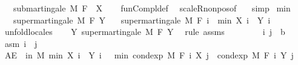 \begin{isabellebody}
\ \ \ {\isachardoublequoteopen}submartingale\ M\ F\ {\isacharparenleft}{\kern0pt}{\isacharminus}{\kern0pt}\ X{\isacharparenright}{\kern0pt}{\isachardoublequoteclose}\isanewline
%
\isadelimproof
\ \ %
\endisadelimproof
%
\isatagproof
{}\isamarkupfalse%
\ fun{\isacharunderscore}{\kern0pt}Compl{\isacharunderscore}{\kern0pt}def\ \isamarkupfalse%
\ scaleR{\isacharunderscore}{\kern0pt}nonpos{\isacharbrackleft}{\kern0pt}of\ {\isachardoublequoteopen}{\isacharminus}{\kern0pt}{}{\isachardoublequoteclose}{\isacharbrackright}{\kern0pt}\ \isamarkupfalse%
\ simp%
\endisatagproof
{\isafoldproof}%
%
\isadelimproof
\isanewline
%
\endisadelimproof
\isanewline
{}\isamarkupfalse%
\ min{\isacharcolon}{\kern0pt}\isanewline
\ \ \ {\isachardoublequoteopen}supermartingale\ M\ F\ Y{\isachardoublequoteclose}\isanewline
\ \ \ {\isachardoublequoteopen}supermartingale\ M\ F\ {\isacharparenleft}{\kern0pt}{\isasymlambda}i\ {\isasymxi}{\isachardot}{\kern0pt}\ min\ {\isacharparenleft}{\kern0pt}X\ i\ {\isasymxi}{\isacharparenright}{\kern0pt}\ {\isacharparenleft}{\kern0pt}Y\ i\ {\isasymxi}{\isacharparenright}{\kern0pt}{\isacharparenright}{\kern0pt}{\isachardoublequoteclose}\isanewline
%
\isadelimproof
%
\endisadelimproof
%
\isatagproof
{}\isamarkupfalse%
\ {\isacharparenleft}{\kern0pt}unfold{\isacharunderscore}{\kern0pt}locales{\isacharparenright}{\kern0pt}\isanewline
\ \ \isamarkupfalse%
\ Y{\isacharcolon}{\kern0pt}\ supermartingale\ M\ F\ Y\ \isamarkupfalse%
\ {\isacharparenleft}{\kern0pt}rule\ assms{\isacharparenright}{\kern0pt}\isanewline
\ \ \isacommand{{\isacharbraceleft}{\kern0pt}}\isamarkupfalse%
\isanewline
\ \ \ \ \isamarkupfalse%
\ i\ j\ {\isacharcolon}{\kern0pt}{\isacharcolon}{\kern0pt}\ {\isacharprime}{\kern0pt}b\ \isamarkupfalse%
\ asm{\isacharcolon}{\kern0pt}\ {\isachardoublequoteopen}i\ {\isasymle}\ j{\isachardoublequoteclose}\isanewline
\ \ \ \ \isamarkupfalse%
\ {\isachardoublequoteopen}AE\ {\isasymxi}\ in\ M{\isachardot}{\kern0pt}\ min\ {\isacharparenleft}{\kern0pt}X\ i\ {\isasymxi}{\isacharparenright}{\kern0pt}\ {\isacharparenleft}{\kern0pt}Y\ i\ {\isasymxi}{\isacharparenright}{\kern0pt}\ {\isasymge}\ min\ {\isacharparenleft}{\kern0pt}cond{\isacharunderscore}{\kern0pt}exp\ M\ {\isacharparenleft}{\kern0pt}F\ i{\isacharparenright}{\kern0pt}\ {\isacharparenleft}{\kern0pt}X\ j{\isacharparenright}{\kern0pt}\ {\isasymxi}{\isacharparenright}{\kern0pt}\ {\isacharparenleft}{\kern0pt}cond{\isacharunderscore}{\kern0pt}exp\ M\ {\isacharparenleft}{\kern0pt}F\ i{\isacharparenright}{\kern0pt}\ {\isacharparenleft}{\kern0pt}Y\ j{\isacharparenright}{\kern0pt}\ {\isasymxi}{\isacharparenright}{\kern0pt}{\isachardoublequoteclose}\ \isamarkupfalse%

\end{isabellebody}
